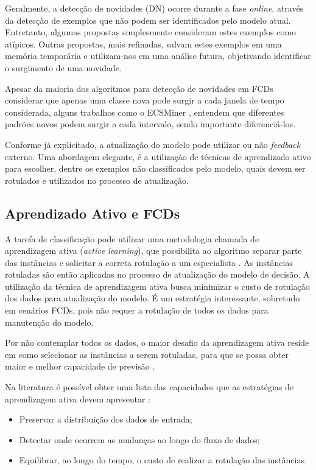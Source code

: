 \documentclass[qual, classic, a4paper]{ufbathesis}
\begin{document}
Geralmente, a detecção de novidades (DN) ocorre durante a fase \textit{online}, através da detecção de exemplos que não podem ser identificados pelo modelo atual. Entretanto, algumas propostas simplesmente consideram estes exemplos como atípicos. Outras propostas, mais refinadas, salvam estes exemplos em uma memória temporária e utilizam-nos em uma análise futura, objetivando identificar o surgimento de uma novidade.

Apesar da maioria dos algoritmos para detecção de novidades em FCDs considerar que apenas uma classe nova pode surgir a cada janela de tempo considerada, alguns trabalhos como o ECSMiner \cite{Masud:2010:ACC:1933307.1934606}, entendem que diferentes padrões novos podem surgir a cada intervalo, sendo importante diferenciá-los.

Conforme já explicitado, a atualização do modelo pode utilizar ou não \textit{feedback} externo. Uma abordagem elegante, é a utilização de técnicas de aprendizado ativo para escolher, dentre os exemplos não classificados pelo modelo, quais devem ser rotulados e utilizados no processo de atualização. 

\subsection{Aprendizado Ativo e FCDs}

A tarefa de classificação pode utilizar uma metodologia chamada de aprendizagem ativa (\textit{active learning}), que possibilita ao algoritmo separar parte das instâncias e solicitar a correta rotulação a um especialista \cite{Tong:2001}. As instâncias rotuladas são então aplicadas no processo de atualização do modelo de decisão.  A utilização da técnica de aprendizagem ativa busca minimizar o custo de rotulação dos dados para atualização do modelo. É um estratégia interessante, sobretudo em cenários FCDs, pois não requer a rotulação de todos os dados para manutenção do modelo.

Por não contemplar todos os dados, o maior desafio da aprendizagem ativa reside em como selecionar as instâncias a serem rotuladas, para que se possa obter maior e melhor capacidade de previsão \cite{Tong:2001}.

Na literatura é possível obter uma lista das capacidades que as estratégias de aprendizagem ativa devem apresentar \cite{Ienco:2014}: 

\begin{itemize}
    \item Preservar a distribuição dos dados de entrada;
    \item Detectar onde ocorrem as mudanças ao longo do fluxo de dados;
    \item Equilibrar, ao longo do tempo, o custo de realizar a rotulação das instâncias.
\end{itemize}
\end{document}
